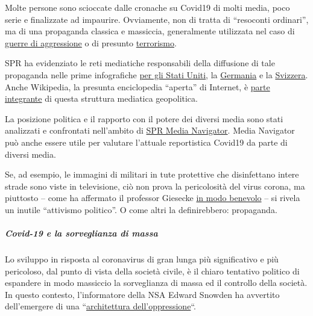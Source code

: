 Molte persone sono scioccate dalle cronache su Covid19 di molti media,
poco serie e finalizzate ad impaurire. Ovviamente, non di tratta di
``resoconti ordinari'', ma di una propaganda classica e massiccia,
generalmente utilizzata nel caso di
\href{https://swprs.org/propaganda-in-the-war-on-yugoslavia/}{guerre di
aggressione} o di presunto
\href{https://www.motherjones.com/politics/2013/01/terror-factory-fbi-trevor-aaronson-book/}{terrorismo}.

SPR ha evidenziato le reti mediatiche responsabili della diffusione di
tale propaganda nelle prime infografiche
\href{https://swprs.org/the-american-empire-and-its-media/}{per gli
Stati Uniti}, la
\href{https://swprs.org/netzwerk-medien-deutschland/}{Germania} e la
\href{https://swprs.org/netzwerk-medien-schweiz/}{Svizzera}. Anche
Wikipedia, la presunta enciclopedia ``aperta'' di Internet, è
\href{https://swprs.org/wikipedia-disinformation-operation/}{parte
integrante} di questa struttura mediatica geopolitica.

La posizione politica e il rapporto con il potere dei diversi media sono
stati analizzati e confrontati nell'ambito di
\href{https://swprs.org/media-navigator/}{SPR Media Navigator}. Media
Navigator può anche essere utile per valutare l'attuale reportistica
Covid19 da parte di diversi media.

Se, ad esempio, le immagini di militari in tute protettive che
disinfettano intere strade sono viste in televisione, ciò non prova la
pericolosità del virus corona, ma piuttosto -- come ha affermato il
professor Giesecke
\href{https://www.addendum.org/coronavirus/interview-johan-giesecke/}{in
modo benevolo} -- si rivela un inutile ``attivismo politico''. O come
altri la definirebbero: propaganda.

\hypertarget{covid-19-e-la-sorveglianza-di-massa}{%
\subparagraph{\texorpdfstring{\textbf{Covid-19 e la sorveglianza di
massa}}{Covid-19 e la sorveglianza di massa}}\label{covid-19-e-la-sorveglianza-di-massa}}

Lo sviluppo in risposta al coronavirus di gran lunga più significativo e
più pericoloso, dal punto di vista della società civile, è il chiaro
tentativo politico di espandere in modo massiccio la sorveglianza di
massa ed il controllo della società. In questo contesto, l'informatore
della NSA Edward Snowden ha avvertito dell'emergere di una
``\href{https://www.vice.com/en_us/article/bvge5q/snowden-warns-governments-are-using-coronavirus-to-build-the-architecture-of-oppression}{architettura
dell'oppressione}``.

